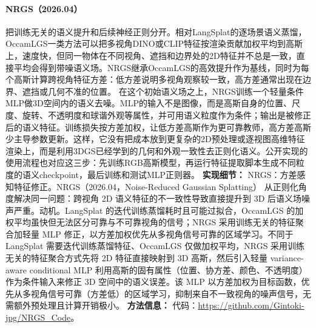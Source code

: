 \paragraph{NRGS（2026.04）\cite{2604_22439}}
把训练无关的语义提升和后续神经正则分开。相对LangSplat的逐场景语义蒸馏，OccamLGS一类方法可以把多视角DINO或CLIP特征按渲染贡献加权平均到高斯上，速度快，但同一物体在不同视角、遮挡和边界处的2D特征并不总是一致，直接平均会得到带噪语义场。NRGS继承OccamLGS的高效提升作为基线，同时为每个高斯计算跨视角特征方差：低方差说明多视角观察较一致，高方差通常出现在边界、遮挡或几何不准的位置。
在这个初始语义场之上，NRGS训练一个轻量条件MLP做3D空间内的语义去噪。MLP的输入不是图像，而是高斯自身的位置、尺度、旋转、不透明度和球谐外观等属性，并可用语义粒度作为条件；输出是被修正后的语义特征。训练损失按方差加权，让低方差高斯作为更可靠教师，高方差高斯少主导参数更新。这样，它没有把成本放到更复杂的2D预处理或逐视图高维特征渲染上，而是利用3DGS已经学到的几何和外观一致性去正则化语义。公开实现的使用流程也对应这三步：先训练RGB高斯模型，再运行特征提取脚本生成不同粒度的语义checkpoint，最后训练和测试MLP正则器。
\textbf{实现细节：} NRGS：方差感知特征修正。NRGS（2026.04，Noise-Reduced Gaussian Splatting） 从正则化角度解决同一问题：跨视角 2D 语义特征的不一致性导致直接提升到 3D 后语义场噪声严重。动机。LangSplat 的迭代训练蒸馏耗时且可能过拟合，OccamLGS 的加权平均虽快但无法区分可靠与不可靠视角的信号；NRGS 采用训练无关的特征聚合加轻量 MLP 修正，以方差加权优先从多视角信号可靠的区域学习。不同于 LangSplat 需要迭代训练蒸馏特征、OccamLGS 仅做加权平均，NRGS 采用训练无关的特征聚合方式先将 2D 特征直接映射到 3D 高斯，然后引入轻量 variance-aware conditional MLP 利用高斯的固有属性（位置、协方差、颜色、不透明度）作为条件输入来修正 3D 空间中的语义误差。该 MLP 以方差加权为目标函数，优先从多视角信号可靠（方差低）的区域学习，抑制来自不一致视角的噪声信号，无需额外预处理且计算开销极小。
\textbf{方法信息：} 代码：\url{https://github.com/Gintoki-jpg/NRGS_Code}。



